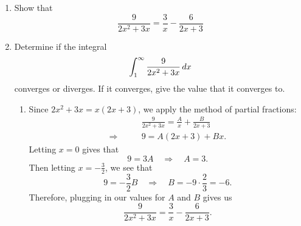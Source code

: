 \documentclass{ximera}
\title{}
\begin{document}
\begin{abstract}		\end{abstract}
\maketitle








\begin{problem}
	\begin{enumerate}
	\item  Show that 
		\begin{equation*}
		\frac{9}{2x^2+3x} = \frac{3}{x} - \frac{6}{2x+3}
		\end{equation*}
	
	\item  Determine if the integral
		\begin{equation*}
		\int_1^\infty \frac{9}{2x^2+3x} \,d x
		\end{equation*}
	converges or diverges.  If it converges, give the value that it converges to.
	
	
	
	\begin{freeResponse}
	\begin{enumerate}
	\item
	Since $2x^2+3x = x(2x+3)$, we apply the method of partial fractions:
		\begin{align*}
		&\frac{9}{2x^2+3x} = \frac{A}{x} + \frac{B}{2x+3}  \\
		\Longrightarrow \qquad &9 = A(2x+3) + Bx.
		\end{align*}
	Letting $x=0$ gives that
		\begin{equation*}
		9 = 3A	\quad	\Longrightarrow \quad	A = 3.
		\end{equation*}
	Then letting $x = -\frac{3}{2}$, we see that
		\begin{equation*}
		9 = - \frac{3}{2} B \quad \Longrightarrow \quad B = - 9 \cdot \frac{2}{3} = -6.
		\end{equation*}
	Therefore, plugging in our values for $A$ and $B$ gives us
		\begin{equation*}
		\frac{9}{2x^2+3x} = \frac{3}{x} - \frac{6}{2x+3}.
		\end{equation*}
		

\end{enumerate}
\end{freeResponse}
\end{enumerate}
\end{problem}
\end{document}
